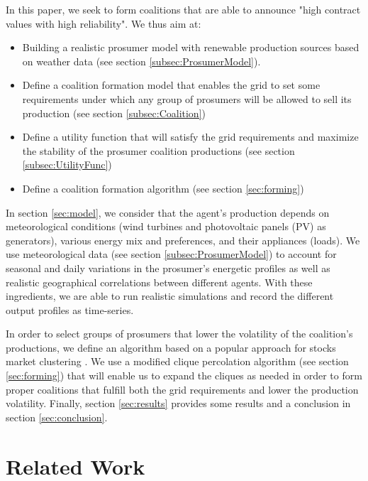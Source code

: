 \documentclass[conference]{IEEEtran}
\begin{document}
In this paper, we seek to form coalitions that are able to announce "high contract values with high reliability". We thus aim at:
\begin{itemize}
\item Building a realistic prosumer model with renewable production sources based on weather data (see section \ref{subsec:ProsumerModel}).
\item Define a coalition formation model that enables the grid to set some requirements under which any group of prosumers will be allowed to sell its production (see section \ref{subsec:Coalition})
\item Define a utility function that will satisfy the grid requirements and maximize the stability of the prosumer coalition productions (see section \ref{subsec:UtilityFunc})
\item Define a coalition formation algorithm (see section \ref{sec:forming})
\end{itemize}

In section \ref{sec:model}, we consider that the agent's production depends on meteorological conditions (wind turbines and photovoltaic panels (PV) as generators), various energy mix and preferences, and their appliances (loads). We use meteorological data (see section \ref{subsec:ProsumerModel}) to account for seasonal and daily variations in the prosumer's energetic profiles as well as realistic geographical correlations between different agents. With these ingredients, we are able to run realistic simulations and record the different output profiles as time-series.

In order to select groups of prosumers that lower the volatility of the coalition's productions, we define an algorithm based on a popular approach for stocks market clustering \cite{Mantegna1999}. We use a modified clique percolation algorithm (see section \ref{sec:forming}) that will enable us to expand the cliques as needed in order to form proper coalitions that fulfill both the grid requirements and lower the production volatility. Finally, section \ref{sec:results} provides some results and a conclusion in section \ref{sec:conclusion}.

%
%

\section{Related Work}
\label{sec:related}
\end{document}
